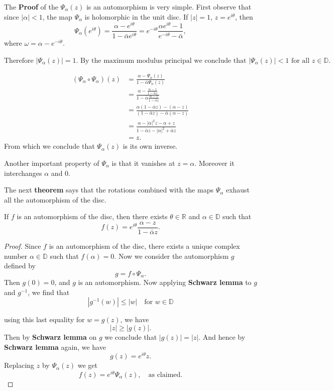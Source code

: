 \documentclass{article}
\begin{document}
The \textbf{Proof} of the $\Psi_\alpha(z)$ is an automorphism is very simple.
First observe that since $|\alpha| < 1$, the map $\Psi_\alpha$ is holomorphic in the unit disc. If $|z| = 1$, $z = e^{i\theta}$, then
$$\Psi_\alpha(e^{i\theta}) = \frac{\alpha - e^{i\theta}}{1 - \bar{\alpha} e^{i\theta}} = e^{-i\theta} \frac{\alpha e^{i\theta} - 1}{e^{-i\theta} - \bar{\alpha}},$$
where $\omega = \alpha - e^{-i\theta}$.

$\text{Therefore } |\Psi_\alpha(z)| = 1. \text{ By the maximum modulus principal}
\text{ we conclude that } |\Psi_\alpha(z)| < 1 \text{ for all } z \in \mathbb{D}.$

\begin{align*}
(\Psi_\alpha \circ \Psi_\alpha)(z) &= \frac{\alpha - \Psi_\alpha(z)}{1 - \bar{\alpha} \Psi_\alpha(z)} \\
&= \frac{\alpha - \frac{\alpha - z}{1 - \bar{\alpha} z}}{1 - \bar{\alpha} \frac{\alpha - z}{1 - \bar{\alpha} z}} \\
&= \frac{\alpha(1 - \bar{\alpha} z) - (\alpha - z)}{(1 - \bar{\alpha} z) - \bar{\alpha}(\alpha - z)} \\
&= \frac{\alpha - |\alpha|^2 z - \alpha + z}{1 - \bar{\alpha} z - |\alpha|^2 + \bar{\alpha} z} \\
&= z.
\end{align*}
From which we conclude that $\Psi_\alpha(z)$ is its own inverse.

Another important property of $\Psi_\alpha$ is that it vanishes at $z = \alpha$. Moreover it interchanges $\alpha$ and $0$.

The next \textbf{theorem} says that the rotations combined with the maps $\Psi_\alpha$ exhaust all the automorphism of the disc.

\begin{theorem}
If $f$ is an automorphism of the disc, then there exists $\theta \in \mathbb{R}$ and $\alpha \in \mathbb{D}$ such that
$$f(z) = e^{i\theta} \frac{\alpha - z}{1 - \bar{\alpha} z}.$$
\end{theorem}

\begin{proof}
Since $f$ is an automorphism of the disc, there exists a unique complex number $\alpha \in \mathbb{D}$ such that $f(\alpha) = 0$.
Now we consider the automorphism $g$ defined by
$$g = f \circ \Psi_\alpha.$$
Then $g(0) = 0$, and $g$ is an automorphism.
Now applying \textbf{Schwarz lemma} to $g$ and $g^{-1}$, we find that
$$|g^{-1}(w)| \le |w| \quad \text{for } w \in \mathbb{D}$$

using this last equality for $w = g(z)$, we have
$$|z| \ge |g(z)|.$$
Then by \textbf{Schwarz lemma} on $g$ we conclude that $|g(z)| = |z|$. And hence by \textbf{Schwarz lemma} again, we have
$$g(z) = e^{i\theta} z.$$
Replacing $z$ by $\Psi_\alpha(z)$ we get
$$f(z) = e^{i\theta} \Psi_\alpha(z), \quad \text{as claimed.}$$
\end{proof}
\end{document}
